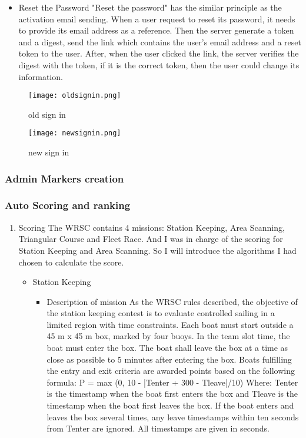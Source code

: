 \begin{enumerate}
\begin{itemize}
\item{Reset the Password}
"Reset the password" has the similar principle as the activation email sending. When a user request to reset its password, it needs to provide its email address as a reference. Then the server generate a token and a digest, send the link which contains the user's email address and a reset token to the user. After, when the user clicked the link, the server verifies the digest with the token, if it is the correct token, then the user could change its information.
\end{itemize}
\begin{figure}[h!]
\centering
\texttt{[image: oldsignin.png]}
\caption{old sign in }
\label{fig-sample}
\end{figure}

\begin{figure}[h!]
\centering
\texttt{[image: newsignin.png]}
\caption{new sign in }
\label{fig-sample}
\end{figure}
\end{enumerate}
\subsubsection{Admin Markers creation}

\subsubsection{Auto Scoring and ranking}
\begin{enumerate}
\item{Scoring}
The WRSC contains 4 missions: Station Keeping, Area Scanning, Triangular Course and Fleet Race. And I was in charge of the scoring for Station Keeping and Area Scanning. So I will introduce the algorithms I had chosen to calculate the score.
\begin{itemize}
\item{Station Keeping}
\begin{itemize}
\item{Description of mission}
As the WRSC rules described, the objective of the station keeping contest is to evaluate controlled sailing in a limited region with time constraints. Each boat must start outside a 45 m x 45 m box, marked by four buoys. In the team slot time, the boat must enter the box. The boat shall leave the box at a time as close as possible to 5 minutes after entering the box. Boats fulfilling the entry and exit criteria are awarded points based on the following formula:
P = max (0, 10 - |Tenter + 300 - Tleave|/10)
Where: Tenter is the timestamp when the boat first enters the box and Tleave is the timestamp
when the boat first leaves the box. If the boat enters and leaves the box several times, any leave timestamps within ten seconds from Tenter are ignored. All timestamps are given in seconds.
\end{itemize}
\end{itemize} 
\end{enumerate}
